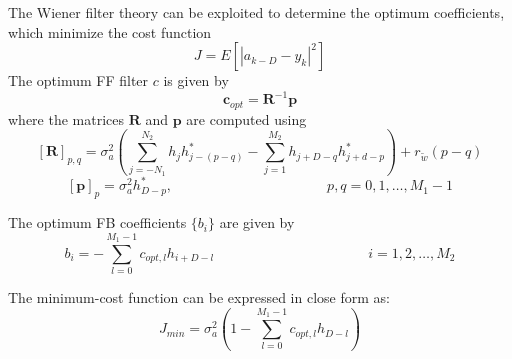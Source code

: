\documentclass[a4paper, 12pt]{report}
\begin{document}
The Wiener filter theory can be exploited to determine the optimum coefficients, which minimize the cost function
\begin{equation}
J = E \left[|a_{k-D}-y_k|^2\right]
\end{equation}
The optimum FF filter $c$ is given by
\begin{equation}\label{c}
\mathbf{c}_{opt} = \mathbf{R}^{-1}\mathbf{p}
\end{equation}
where the matrices $\mathbf{R}$ and $\mathbf{p}$ are computed using
\begin{equation}
\mathbf{[R]}_{p,q} = \sigma_a^2 \left( \sum_{j=-N_1}^{N_2}h_jh^*_{j-(p-q)}-\sum_{j=1}^{M_2}h_{j+D-q}h^*_{j+d-p} \right) + r_{\tilde{w}}(p-q)
\end{equation}
\begin{equation}
\mathbf{[p]}_p = \sigma_a^2 h^*_{D-p}, \quad\quad\quad\quad\quad\quad\quad\quad\quad\quad\quad p,q = 0,1,\dots,M_1-1
\end{equation}

The optimum FB coefficients $\{b_i\}$ are given by
\begin{equation}
b_i = -\sum_{l=0}^{M_1-1}c_{opt,l}h_{i+D-l} \quad\quad\quad\quad\quad\quad\quad\quad\quad\quad\quad i =1,2,\dots,M_2
\end{equation}

The minimum-cost function can be expressed in close form as:
\begin{equation}
J_{min} = \sigma^2_a \left( 1-\sum_{l=0}^{M_1-1} c_{opt,l}h_{D-l}\right)
\end{equation}
\end{document}
